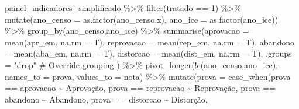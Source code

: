 \documentclass[
  letterpaper,
  DIV=11,
  numbers=noendperiod]{scrartcl}
\newenvironment{Shaded}{\begin{snugshade}}{\end{snugshade}}
\newcommand{\AttributeTok}[1]{\textcolor[rgb]{0.40,0.45,0.13}{#1}}
\newcommand{\CommentTok}[1]{\textcolor[rgb]{0.37,0.37,0.37}{#1}}
\newcommand{\DecValTok}[1]{\textcolor[rgb]{0.68,0.00,0.00}{#1}}
\newcommand{\FunctionTok}[1]{\textcolor[rgb]{0.28,0.35,0.67}{#1}}
\newcommand{\NormalTok}[1]{\textcolor[rgb]{0.00,0.23,0.31}{#1}}
\newcommand{\SpecialCharTok}[1]{\textcolor[rgb]{0.37,0.37,0.37}{#1}}
\newcommand{\StringTok}[1]{\textcolor[rgb]{0.13,0.47,0.30}{#1}}
\begin{document}
\begin{Shaded}
\begin{Highlighting}[]
\NormalTok{painel\_indicadores\_simplificado }\SpecialCharTok{\%\textgreater{}\%} 
  \FunctionTok{filter}\NormalTok{(tratado }\SpecialCharTok{==} \DecValTok{1}\NormalTok{) }\SpecialCharTok{\%\textgreater{}\%} 
  \FunctionTok{mutate}\NormalTok{(}\AttributeTok{ano\_censo =} \FunctionTok{as.factor}\NormalTok{(ano\_censo.x),}
         \AttributeTok{ano\_ice =} \FunctionTok{as.factor}\NormalTok{(ano\_ice)) }\SpecialCharTok{\%\textgreater{}\%} 
  \FunctionTok{group\_by}\NormalTok{(ano\_censo,ano\_ice) }\SpecialCharTok{\%\textgreater{}\%} 
  \FunctionTok{summarise}\NormalTok{(}\AttributeTok{aprovacao =} \FunctionTok{mean}\NormalTok{(apr\_em, }\AttributeTok{na.rm =}\NormalTok{ T),}
            \AttributeTok{reprovacao =} \FunctionTok{mean}\NormalTok{(rep\_em, }\AttributeTok{na.rm =}\NormalTok{ T),}
            \AttributeTok{abandono =} \FunctionTok{mean}\NormalTok{(aba\_em, }\AttributeTok{na.rm =}\NormalTok{ T),}
            \AttributeTok{distorcao =} \FunctionTok{mean}\NormalTok{(dist\_em, }\AttributeTok{na.rm =}\NormalTok{ T),}
            \AttributeTok{.groups =} \StringTok{"drop"}  \CommentTok{\# Override grouping}
\NormalTok{            ) }\SpecialCharTok{\%\textgreater{}\%}
\FunctionTok{pivot\_longer}\NormalTok{(}\SpecialCharTok{!}\FunctionTok{c}\NormalTok{(ano\_censo,ano\_ice), }
             \AttributeTok{names\_to =} \StringTok{\textquotesingle{}prova\textquotesingle{}}\NormalTok{,}
             \AttributeTok{values\_to =} \StringTok{\textquotesingle{}nota\textquotesingle{}}\NormalTok{) }\SpecialCharTok{\%\textgreater{}\%} 
  \FunctionTok{mutate}\NormalTok{(}\AttributeTok{prova =} \FunctionTok{case\_when}\NormalTok{(prova }\SpecialCharTok{==} \StringTok{\textquotesingle{}aprovacao\textquotesingle{}} \SpecialCharTok{\textasciitilde{}} \StringTok{\textquotesingle{}Aprovação\textquotesingle{}}\NormalTok{,}
\NormalTok{                         prova }\SpecialCharTok{==} \StringTok{\textquotesingle{}reprovacao\textquotesingle{}} \SpecialCharTok{\textasciitilde{}} \StringTok{\textquotesingle{}Reprovação\textquotesingle{}}\NormalTok{,}
\NormalTok{                         prova }\SpecialCharTok{==} \StringTok{\textquotesingle{}abandono\textquotesingle{}} \SpecialCharTok{\textasciitilde{}} \StringTok{\textquotesingle{}Abandono\textquotesingle{}}\NormalTok{,}
\NormalTok{                         prova }\SpecialCharTok{==} \StringTok{\textquotesingle{}distorcao\textquotesingle{}} \SpecialCharTok{\textasciitilde{}} \StringTok{\textquotesingle{}Distorção\textquotesingle{}}\NormalTok{,}

\end{Highlighting}
\end{Shaded}
\end{document}
